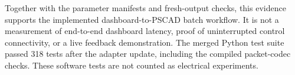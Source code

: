 Together with the parameter manifests and fresh-output checks, this evidence
supports the implemented dashboard-to-PSCAD batch workflow. It is not a
measurement of end-to-end dashboard latency, proof of uninterrupted control
connectivity, or a live feedback demonstration. The merged Python test suite
passed 318 tests after the adapter update, including the compiled packet-codec
checks. These software tests are not counted as electrical experiments.
